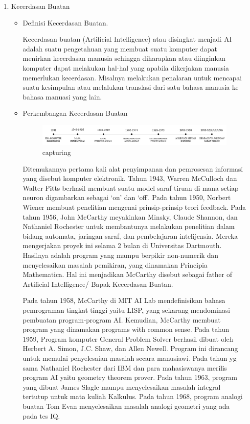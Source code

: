 \begin{enumerate}
\item Kecerdasan Buatan
\begin{itemize}
\item Definisi Kecerdasan Buatan.

Kecerdasan buatan (Artificial Intelligence) atau disingkat menjadi AI adalah suatu pengetahuan yang membuat suatu komputer dapat menirkan  kecerdasan manusia sehingga diharapkan atau diinginkan komputer dapat melakukan hal-hal yang apabila dikerjakan manusia memerlukan kecerdasan. Misalnya melakukan penalaran untuk mencapai suatu kesimpulan atau melalukan translasi dari satu bahasa manusia ke bahasa manuasi yang lain.


\item Perkembangan Kecerdasan Buatan
\begin{figure}[ht]
\centering
\includegraphics[scale=0.5]{figures/Screenshot_1.png}
\caption{capturing}
\label{perkembangan}
\end{figure}

Ditemukannya pertama kali alat penyimpanan dan pemrosesan informasi yang disebut komputer elektronik. Tahun 1943, Warren McCulloch dan Walter Pitts berhasil membuat suatu model saraf tiruan di mana setiap neuron digambarkan sebagai ‘on’ dan ‘off’. Pada tahun 1950, Norbert Wiener membuat penelitian mengenai prinsip-prinsip teori feedback. Pada tahun 1956, John McCarthy meyakinkan Minsky, Claude Shannon, dan Nathaniel Rochester untuk membantunya melakukan penelitian dalam bidang automata, jaringan saraf, dan pembelajaran intelijensia. Mereka mengerjakan proyek ini selama 2 bulan di Universitas Dartmouth. Hasilnya adalah program yang mampu berpikir non-numerik dan menyelesaikan masalah pemikiran, yang dinamakan Principia Mathematica. Hal ini menjadikan McCarthy disebut sebagai father of Artificial Intelligence/ Bapak Kecerdasan Buatan.

Pada tahun 1958, McCarthy di MIT AI Lab mendefinisikan bahasa pemrograman tingkat tinggi yaitu LISP, yang sekarang mendominasi pembuatan program-program AI. Kemudian, McCarthy membuat program yang dinamakan programs with common sense. Pada tahun 1959, Program komputer General Problem Solver berhasil dibuat oleh Herbert A. Simon, J.C. Shaw, dan Allen Newell. Program ini dirancang untuk memulai penyelesaian masalah secara manusiawi. Pada tahun yg sama Nathaniel Rochester dari IBM dan para mahasiswanya merilis program AI yaitu geometry theorem prover. Pada tahun 1963, program yang dibuat James Slagle mampu menyelesaikan masalah integral tertutup untuk mata kuliah Kalkulus. Pada tahun 1968, program analogi buatan Tom Evan menyelesaikan masalah analogi geometri yang ada pada tes IQ.


\end{itemize}
\end{enumerate}
